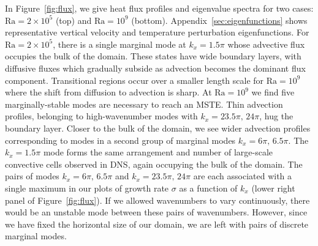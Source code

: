 \documentclass[reprint,amsmath,amssymb,aps,nofootinbib]{revtex4-1}
\newcommand\Ra{\mathrm{Ra}}
\begin{document}
In Figure~\ref{fig:flux}, we give heat flux profiles and eigenvalue spectra for two cases: $\Ra = 2 \times 10^5$ (top) and $\Ra = 10^9$ (bottom). 
Appendix~\ref{sec:eigenfunctions} shows representative vertical velocity and temperature perturbation eigenfunctions.
For $\Ra = 2 \times 10^5$, there is a single marginal mode at $k_x = 1.5\pi$ whose advective flux occupies the bulk of the domain. 
These states have wide boundary layers, with diffusive fluxes which gradually subside as advection becomes the dominant flux component. 
Transitional regions occur over a smaller length scale for $\Ra = 10^9$ where the shift from diffusion to advection is sharp.
At $\Ra=10^9$ we find five marginally-stable modes are necessary to reach an MSTE.
Thin advection profiles, belonging to high-wavenumber modes with $k_x=23.5\pi, \, 24\pi$, hug the boundary layer. 
Closer to the bulk of the domain, we see wider advection profiles corresponding to modes in a second group of marginal modes $k_x = 6\pi, \, 6.5\pi$.
The $k_x = 1.5\pi$ mode forms the same arrangement and number of large-scale convective cells observed in DNS, again occupying the bulk of the domain.
The pairs of modes $k_x = 6\pi, \, 6.5\pi$ and $k_x=23.5\pi, \, 24\pi$ are each associated with a single maximum in our plots of growth rate $\sigma$ as a function of $k_x$ (lower right panel of Figure~\ref{fig:flux}).
If we allowed wavenumbers to vary continuously, there would be an unstable mode between these pairs of wavenumbers.
However, since we have fixed the horizontal size of our domain, we are left with pairs of discrete marginal modes.
\end{document}
